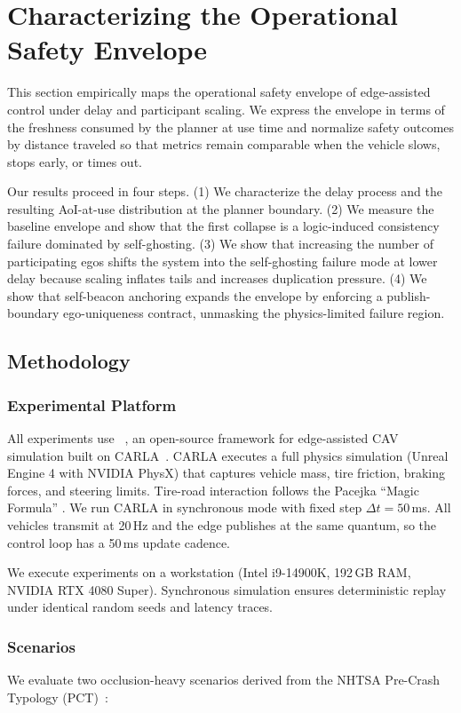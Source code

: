 \section{Characterizing the Operational Safety Envelope}
\label{sec:eval}

This section empirically maps the operational safety envelope of edge-assisted control under delay and participant scaling. We express the envelope in terms of the freshness consumed by the planner at use time and normalize safety outcomes by distance traveled so that metrics remain comparable when the vehicle slows, stops early, or times out.

Our results proceed in four steps. (1) We characterize the delay process and the resulting AoI-at-use distribution at the planner boundary. (2) We measure the baseline envelope and show that the first collapse is a logic-induced consistency failure dominated by self-ghosting. (3) We show that increasing the number of participating egos shifts the system into the self-ghosting failure mode at lower delay because scaling inflates tails and increases duplication pressure. (4) We show that self-beacon anchoring expands the envelope by enforcing a publish-boundary ego-uniqueness contract, unmasking the physics-limited failure region.

\subsection{Methodology}
\subsubsection{Experimental Platform}
All experiments use \ecav~\cite{eCAV}, an open-source framework for edge-assisted CAV simulation built on CARLA~\cite{dosovitskiy_carla_nodate}. CARLA executes a full physics simulation (Unreal Engine 4 with NVIDIA PhysX) that captures vehicle mass, tire friction, braking forces, and steering limits. Tire-road interaction follows the Pacejka ``Magic Formula'' \cite{pacejka-book}. We run CARLA in synchronous mode with fixed step $\Delta t = 50$\,ms. All vehicles transmit at 20\,Hz and the edge publishes at the same quantum, so the control loop has a 50\,ms update cadence.

We execute experiments on a workstation (Intel i9-14900K, 192\,GB RAM, NVIDIA RTX 4080 Super). Synchronous simulation ensures deterministic replay under identical random seeds and latency traces.

\subsubsection{Scenarios}
We evaluate two occlusion-heavy scenarios derived from the NHTSA Pre-Crash Typology (PCT)~\cite{NHTSA_Typology}:

